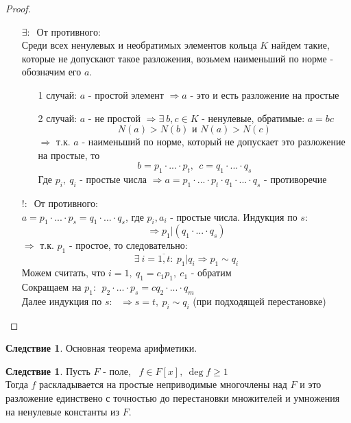 \documentclass[a4paper, 12pt]{article}
\newcommand\tab[1][.5cm]{\hspace*{#1}}
\newcounter{concount}
\theoremstyle{definition}
\newtheorem{consequensenum}[concount]{Следствие}
\begin{document}
  \begin{proof}\tab
    \begin{itemize}
      \item[ $\exists: \ $ ] От противного:\\
    Среди всех ненулевых и необратимых элементов кольца $K$ найдем такие, которые не допускают такое разложения, возьмем наименьший по норме - обозначим его $a$. 
    \begin{itemize}
      \item[1 случай: ] $a$ - простой элемент $\Longrightarrow a$ - это и есть разложение на простые
      \item[2 случай: ] $a$ - не простой $\Longrightarrow \exists \ b, c \in K$ - ненулевые, обратимые: $a = bc$
      $$N(a)>N(b) \text{ и } N(a)>N(c)$$
      $\Longrightarrow $ т.к. $a$ - наименьший по норме, который не допускает это разложение на простые, то 
      $$b = p_1\cdot ... \cdot p_t, \ \ c = q_1\cdot ... \cdot q_s$$
      Где $p_i, \ q_i$ - простые числа $\Longrightarrow a = p_1\cdot ... \cdot p_t\cdot q_1\cdot ... \cdot q_s$ - противоречие 
    \end{itemize}
    \item[ $!: \ $ ] От противного:\\
    $a = p_1\cdot ... \cdot p_s = q_1\cdot ... \cdot q_s$, где $p_i, a_i$ - простые числа. Индукция по $s$:  
    $$\Longrightarrow p_1 | (q_1\cdot ... \cdot q_s)$$
    $\Longrightarrow $  т.к. $p_1$ - простое, то следовательно: 
    $$\exists \ i = \overline{1,t}: \ p_1 | q_i \Longrightarrow p_1\sim q_i$$
    Можем считать, что $i =1, \ q_1 = c_1p_1, \ c_1$ - обратим\\
    Сокращаем на $p_1 : \ \ p_2\cdot ... \cdot p_s = cq_2\cdot ...\cdot q_m$\\
    Далее индукция по $s$: \ $\Longrightarrow s=t, \ p_i \sim q_i$ (при подходящей перестановке)  
    \end{itemize}
  \end{proof}
  \setcounter{concount}{0}
  \begin{consequensenum}
    Основная теорема арифметики.
  \end{consequensenum}
  \begin{consequensenum}
    Пусть $F$ - поле, \ $f\in F[x], \ \deg f \geq 1$\\
    Тогда $f$ раскладывается на простые неприводимые многочлены над $F$ и это разложение единствено с точностью до перестановки множителей и умножения на ненулевые константы из $F$.      
  \end{consequensenum}
\end{document}

